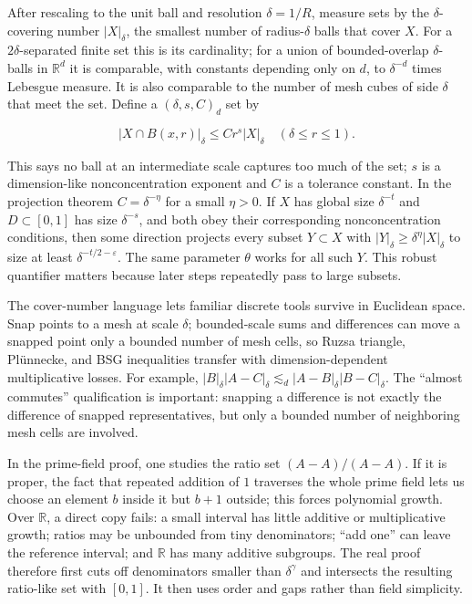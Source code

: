After rescaling to the unit ball and resolution \(\delta=1/R\), measure sets by the \(\delta\)-covering number \(|X|_\delta\), the smallest number of radius-\(\delta\) balls that cover \(X\). For a \(2\delta\)-separated finite set this is its cardinality; for a union of bounded-overlap \(\delta\)-balls in \(\mathbb R^d\) it is comparable, with constants depending only on \(d\), to \(\delta^{-d}\) times Lebesgue measure. It is also comparable to the number of mesh cubes of side \(\delta\) that meet the set. Define a \((\delta,s,C)_d\) set by

\[|X\cap B(x,r)|_\delta\le Cr^s|X|_\delta\quad(\delta\le r\le1).\]

This says no ball at an intermediate scale captures too much of the set; \(s\) is a dimension-like nonconcentration exponent and \(C\) is a tolerance constant. In the projection theorem \(C=\delta^{-\eta}\) for a small \(\eta>0\). If \(X\) has global size \(\delta^{-t}\) and \(D\subset[0,1]\) has size \(\delta^{-s}\), and both obey their corresponding nonconcentration conditions, then some direction projects every subset \(Y\subset X\) with \(|Y|_\delta\ge\delta^{\eta}|X|_\delta\) to size at least \(\delta^{-t/2-\varepsilon}\). The same parameter \(\theta\) works for all such \(Y\). This robust quantifier matters because later steps repeatedly pass to large subsets.

The cover-number language lets familiar discrete tools survive in Euclidean space. Snap points to a mesh at scale \(\delta\); bounded-scale sums and differences can move a snapped point only a bounded number of mesh cells, so Ruzsa triangle, Plünnecke, and BSG inequalities transfer with dimension-dependent multiplicative losses. For example, \(|B|_\delta|A-C|_\delta\lesssim_d |A-B|_\delta|B-C|_\delta\). The ``almost commutes'' qualification is important: snapping a difference is not exactly the difference of snapped representatives, but only a bounded number of neighboring mesh cells are involved.

In the prime-field proof, one studies the ratio set \((A-A)/(A-A)\). If it is proper, the fact that repeated addition of \(1\) traverses the whole prime field lets us choose an element \(b\) inside it but \(b+1\) outside; this forces polynomial growth. Over \(\mathbb R\), a direct copy fails: a small interval has little additive or multiplicative growth; ratios may be unbounded from tiny denominators; ``add one'' can leave the reference interval; and \(\mathbb R\) has many additive subgroups. The real proof therefore first cuts off denominators smaller than \(\delta^\gamma\) and intersects the resulting ratio-like set with \([0,1]\). It then uses order and gaps rather than field simplicity.

